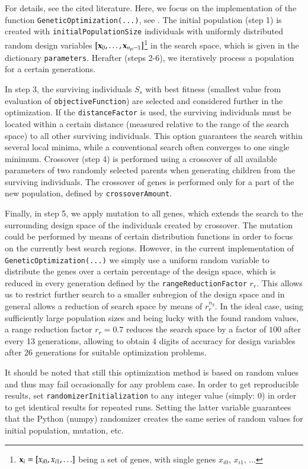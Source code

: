 For details, see the cited literature. Here, we focus on the implementation of the function 
\texttt{GeneticOptimization(...)}, see .
The initial population (step 1) is created with \texttt{initialPopulationSize} individuals with uniformly distributed random design variables $[\mathbf{x}_0, \ldots, \mathbf{x}_{n_{pi}-1}]$\footnote{$\mathbf{x}_i=[x_{i0}, x_{i1}, \ldots]$ being a set of genes, with single genes $x_{i0}$, $x_{i1}$, ... } in the search space, which is given in the dictionary \texttt{parameters}. Herafter (steps 2-6), we iteratively process a population for a certain  generations.

In step 3, the surviving individuals $S_s$ with best fitness (smallest value from evaluation of \texttt{objectiveFunction}) are selected and considered further in the optimization. If the \texttt{distanceFactor} is used, the surviving individuals must be located within a certain distance (measured relative to the range of the search space) to all other surviving individuals. This option guarantees the search within several local minima, while a conventional search often converges to one single minimum.
Crossover (step 4)  is performed using a crossover of all available parameters of two randomly selected parents when generating children from the surviving individuals. The crossover of genes is performed only for a part of the new population, defined by \texttt{crossoverAmount}.

Finally, in step 5, we apply mutation to all genes, which extends the search to the surrounding design space of the individuals created by crossover. The mutation could be performed by means of certain distribution functions in order to focus on the currently best search regions. However, in the current implementation of \texttt{GeneticOptimization(...)} we simply use a uniform random variable to distribute the genes over a certain percentage of the design space, which is reduced in every generation defined by the \texttt{rangeReductionFactor} $r_r$. This allows us to restrict further search to a smaller subregion of the design space and in general allows a reduction of search space by means of $r_r^{n_g}$. In the ideal case, using sufficiently large population sizes and being lucky with the found random values, a range reduction factor $r_r=0.7$ reduces the search space by a factor of $100$ after every 13 generations, allowing to obtain 4 digits of accuracy for design variables after 26 generations for suitable optimization problems.

It should be noted that still this optimization method is based on random values and thus may fail occasionally for any problem case. In order to get reproducible results, set \texttt{randomizerInitialization} to any integer value (simply: 0) in order to get identical results for repeated runs. Setting the latter variable guarantees that the Python (numpy) randomizer creates the same series of random values for initial population, mutation, etc.




